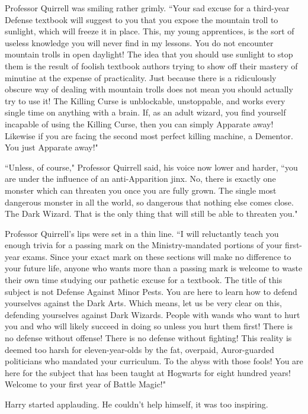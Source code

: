 Professor Quirrell was smiling rather grimly. ``Your sad excuse for a third-year Defense textbook will suggest to you that you expose the mountain troll to sunlight, which will freeze it in place. This, my young apprentices, is the sort of useless knowledge you will never find in my lessons. You do not encounter mountain trolls in open daylight! The idea that you should use sunlight to stop them is the result of foolish textbook authors trying to show off their mastery of minutiae at the expense of practicality. Just because there is a ridiculously obscure way of dealing with mountain trolls does not mean you should actually try to use it! The Killing Curse is unblockable, unstoppable, and works every single time on anything with a brain. If, as an adult wizard, you find yourself incapable of using the Killing Curse, then you can simply Apparate away! Likewise if you are facing the second most perfect killing machine, a Dementor. You just Apparate away!"

``Unless, of course," Professor Quirrell said, his voice now lower and harder, ``you are under the influence of an anti-Apparition jinx. No, there is exactly one monster which can threaten you once you are fully grown. The single most dangerous monster in all the world, so dangerous that nothing else comes close. The Dark Wizard. That is the only thing that will still be able to threaten you."

Professor Quirrell's lips were set in a thin line. ``I will reluctantly teach you enough trivia for a passing mark on the Ministry-mandated portions of your first-year exams. Since your exact mark on these sections will make no difference to your future life, anyone who wants more than a passing mark is welcome to waste their own time studying our pathetic excuse for a textbook. The title of this subject is not Defense Against Minor Pests. You are here to learn how to defend yourselves against the Dark Arts. Which means, let us be very clear on this, defending yourselves against Dark Wizards. People with wands who want to hurt you and who will likely succeed in doing so unless you hurt them first! There is no defense without offense! There is no defense without fighting! This reality is deemed too harsh for eleven-year-olds by the fat, overpaid, Auror-guarded politicians who mandated your curriculum. To the abyss with those fools! You are here for the subject that has been taught at Hogwarts for eight hundred years! Welcome to your first year of Battle Magic!"

Harry started applauding. He couldn't help himself, it was too inspiring.

